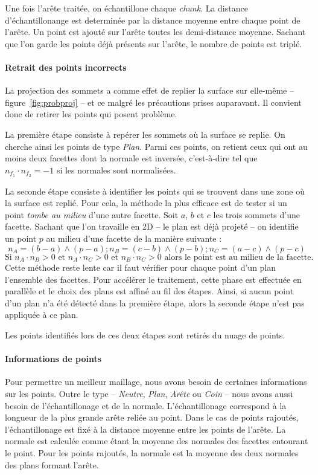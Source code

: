 ﻿\documentclass[12pt, twoside]{article}
\begin{document}
Une fois l'arête traitée, on échantillone chaque \textit{chunk}. La distance d'échantillonange est determinée par la distance moyenne entre chaque point de l'arête. Un point est ajouté sur l'arête toutes les demi-distance moyenne. Sachant que l'on garde les points déjà présents sur l'arête, le nombre de points est triplé.

\paragraph{Retrait des points incorrects} La projection des sommets a comme effet de replier la surface sur elle-même -- figure~\ref{fig:probproj} -- et ce malgré les précautions prises auparavant. Il convient donc de retirer les points qui posent problème.

La première étape consiste à repérer les sommets où la surface se replie. On cherche ainsi les points de type \textit{Plan}. Parmi ces points, on retient ceux qui ont au moins deux facettes dont la normale est inversée, c'est-à-dire tel que $n_{f_{1}} \cdot n_{f_{2}} = -1$ si les normales sont normalisées.

La seconde étape consiste à identifier les points qui se trouvent dans une zone où la surface est replié. Pour cela, la méthode la plus efficace est de tester si un point \textit{tombe au milieu} d'une autre facette. Soit $a$, $b$ et $c$ les trois sommets d'une facette. Sachant que l'on travaille en 2D -- le plan est déjà projeté -- on identifie un point $p$ au milieu d'une facette de la manière suivante :
$$n_A = (b-a)\wedge(p-a) ; n_B = (c-b)\wedge(p-b) ; n_C = (a-c)\wedge(p-c)$$
$$\text{Si }n_A\cdot n_B > 0 \text{ et } n_A\cdot n_C > 0 \text{ et } n_B\cdot n_C > 0 \text{ alors le point est au milieu de la facette.}$$
Cette méthode reste lente car il faut vérifier pour chaque point d'un plan l'ensemble des facettes. Pour accélérer le traitement, cette phase est effectuée en parallèle et le choix des plans est affiné au fil des étapes. Ainsi, si aucun point d'un plan n'a été détecté dans la première étape, alors la seconde étape n'est pas appliquée à ce plan.

Les points identifiés lors de ces deux étapes sont retirés du nuage de points.

\paragraph{Informations de points} Pour permettre un meilleur maillage, nous avons besoin de certaines informations sur les points. Outre le type -- \textit{Neutre}, \textit{Plan}, \textit{Arête} ou \textit{Coin} -- nous avons aussi besoin de l'échantillonage et de la normale. L'échantillonage correspond à la longueur de la plus grande arête reliée au point. Dans le cas de points rajoutés, l'échantillonage est fixé à la distance moyenne entre les points de l'arête. La normale est calculée comme étant la moyenne des normales des facettes entourant le point. Pour les points rajoutés, la normale est la moyenne des deux normales des plans formant l'arête.\newline
\end{document}
